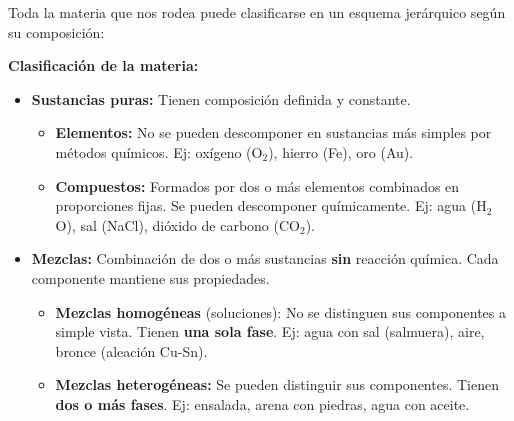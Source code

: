 \documentclass[12pt, a4paper]{article}
\begin{document}
Toda la materia que nos rodea puede clasificarse en un esquema jerárquico según su composición:

\begin{cuadroteoria}
\textbf{Clasificación de la materia:}
\begin{itemize}[leftmargin=*]
  \item \textbf{Sustancias puras:} Tienen composición definida y constante.
  \begin{itemize}
    \item \textbf{Elementos:} No se pueden descomponer en sustancias más simples por métodos químicos. Ej: oxígeno (O$_2$), hierro (Fe), oro (Au).
    \item \textbf{Compuestos:} Formados por dos o más elementos combinados en proporciones fijas. Se pueden descomponer químicamente. Ej: agua (H$_2$O), sal (NaCl), dióxido de carbono (CO$_2$).
  \end{itemize}
  
  \item \textbf{Mezclas:} Combinación de dos o más sustancias \textbf{sin} reacción química. Cada componente mantiene sus propiedades.
  \begin{itemize}
    \item \textbf{Mezclas homogéneas} (soluciones): No se distinguen sus componentes a simple vista. Tienen \textbf{una sola fase}. Ej: agua con sal (salmuera), aire, bronce (aleación Cu-Sn).
    \item \textbf{Mezclas heterogéneas:} Se pueden distinguir sus componentes. Tienen \textbf{dos o más fases}. Ej: ensalada, arena con piedras, agua con aceite.
  \end{itemize}
\end{itemize}
\end{cuadroteoria}
\end{document}
